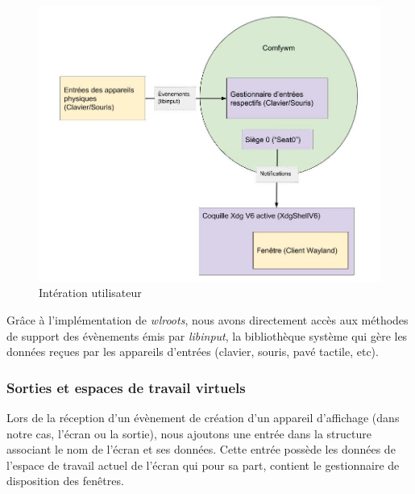 \documentclass[titlepage]{article}
\begin{document}
\begin{figure}[H]
	\centering
	\includegraphics[width=\textwidth]{interaction_utilisateur.jpg}
	\caption{Intération utilisateur}
\end{figure}

\par
Grâce à l'implémentation de \textit{wlroots}, nous avons directement accès aux méthodes de support des évènements émis par \textit{libinput}, la bibliothèque système qui gère les données reçues par les appareils d'entrées (clavier, souris, pavé tactile, etc).
\bigskip

\subsubsection{Sorties et espaces de travail virtuels}
\par
Lors de la réception d'un évènement de création d'un appareil d'affichage (dans notre cas, l'écran ou la sortie), nous ajoutons une entrée dans la structure associant le nom de l'écran et ses données. Cette entrée possède les données de l'espace de travail actuel de l'écran qui pour sa part, contient le gestionnaire de disposition des fenêtres.
\bigskip
\end{document}

